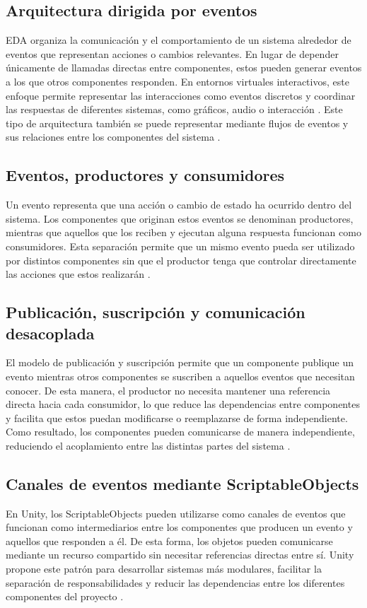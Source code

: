 \subsection{Arquitectura dirigida por eventos}
EDA organiza la comunicación y el comportamiento de un sistema alrededor de eventos que representan acciones o cambios relevantes. En lugar de depender únicamente de llamadas directas entre componentes, estos pueden generar eventos a los que otros componentes responden. En entornos virtuales interactivos, este enfoque permite representar las interacciones como eventos discretos y coordinar las respuestas de diferentes sistemas, como gráficos, audio o interacción \cite{oberhauser2023vr,edmunds2006mixed}. Este tipo de arquitectura también se puede representar mediante flujos de eventos y sus relaciones entre los componentes del sistema \cite{oberhauser2023vr}.
\subsection{Eventos, productores y consumidores}
Un evento representa que una acción o cambio de estado ha ocurrido dentro del sistema. Los componentes que originan estos eventos se denominan productores, mientras que aquellos que los reciben y ejecutan alguna respuesta funcionan como consumidores. Esta separación permite que un mismo evento pueda ser utilizado por distintos componentes sin que el productor tenga que controlar directamente las acciones que estos realizarán \cite{eugster2003publish}.
\subsection{Publicación, suscripción y comunicación desacoplada}
El modelo de publicación y suscripción permite que un componente publique un evento mientras otros componentes se suscriben a aquellos eventos que necesitan conocer. De esta manera, el productor no necesita mantener una referencia directa hacia cada consumidor, lo que reduce las dependencias entre componentes y facilita que estos puedan modificarse o reemplazarse de forma independiente. Como resultado, los componentes pueden comunicarse de manera independiente, reduciendo el acoplamiento entre las distintas partes del sistema \cite{eugster2003publish}.
\subsection{Canales de eventos mediante ScriptableObjects}
En Unity, los ScriptableObjects pueden utilizarse como canales de eventos que funcionan como intermediarios entre los componentes que producen un evento y aquellos que responden a él. De esta forma, los objetos pueden comunicarse mediante un recurso compartido sin necesitar referencias directas entre sí. Unity propone este patrón para desarrollar sistemas más modulares, facilitar la separación de responsabilidades y reducir las dependencias entre los diferentes componentes del proyecto \cite{unity2026scriptableevents}.

